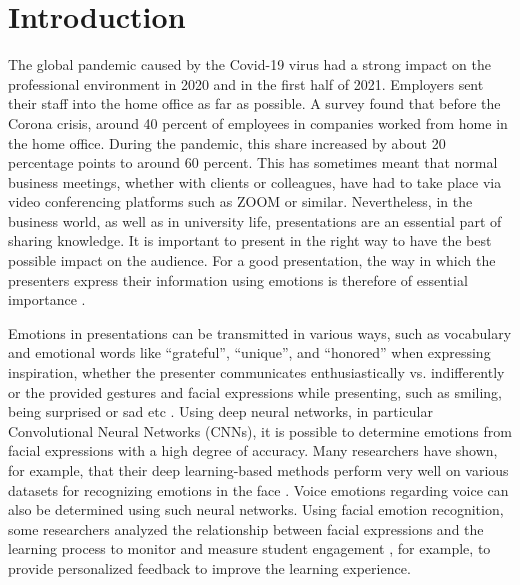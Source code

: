 \section{Introduction}
\label{sec:intro}
The global pandemic caused by the Covid-19 virus had a strong impact on the professional environment in 2020 and in the first half of 2021. Employers sent their staff into the home office as far as possible. A survey found that before the Corona crisis, around 40 percent of employees in companies worked from home in the home office. During the pandemic, this share increased by about 20 percentage points to around 60 percent. This has sometimes meant that normal business meetings, whether with clients or colleagues, have had to take place via video conferencing platforms such as ZOOM or similar. Nevertheless, in the business world, as well as in university life, presentations are an essential part of sharing knowledge. It is important to present in the right way to have the best possible impact on the audience. For a good presentation, the way in which the presenters express their information using emotions is therefore of essential importance \cite{derrico_tracking_2019}.

Emotions in presentations can be transmitted in various ways, such as vocabulary and emotional words like “grateful”, “unique”, and “honored” when expressing inspiration, whether the presenter communicates enthusiastically vs. indifferently or the provided gestures and facial expressions while presenting, such as smiling, being surprised or sad etc \cite{zeng_emoco_2019, rosler_reducing_2021}. Using deep neural networks, in particular Convolutional Neural Networks (CNNs), it is possible to determine emotions from facial expressions with a high degree of accuracy. Many researchers have shown, for example, that their deep learning-based methods perform very well on various datasets for recognizing emotions in the face \cite{ko_brief_2018}. Voice emotions regarding voice can also be determined using such neural networks. Using facial emotion recognition, some researchers analyzed the relationship between facial expressions and the learning process to monitor and measure student engagement \cite{de_carolis_engaged_2019}, for example, to provide personalized feedback to improve the learning experience. 

